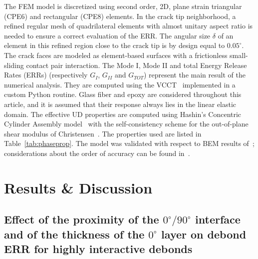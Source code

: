 \documentclass[review]{elsarticle}
\begin{document}
The FEM model is discretized using second order, 2D, plane strain triangular (CPE6) and rectangular (CPE8) elements. In the crack tip neighborhood, a refined regular mesh of quadrilateral elements with almost unitary aspect ratio is needed to ensure a correct evaluation of the ERR. The angular size $\delta$ of an element in this refined region close to the crack tip is by design equal to $0.05^{\circ}$. The crack faces are modeled as element-based surfaces with a frictionless small-sliding contact pair interaction. The Mode I, Mode II and total Energy Release Rates (ERRs) (respectively $G_{I}$, $G_{II}$ and $G_{TOT}$) represent the main result of the numerical analysis. They are computed using the VCCT~\cite{Krueger2004} implemented in a custom Python routine. Glass fiber and epoxy are considered throughout this article, and it is assumed that their response always lies in the linear elastic domain. The effective UD properties are computed using Hashin's Concentric Cylinder Assembly model~\cite{Hashin1983} with the self-consistency scheme for the out-of-plane shear modulus of Christensen~\cite{Christensen1979}. The properties used are listed in Table~\ref{tab:phaseprop}. The model was validated with respect to BEM results of~\cite{Paris2007,Sandino2016}; considerations about the order of accuracy can be found in~\cite{DiStasio2019}.


\section{Results \& Discussion}

\subsection{Effect of the proximity of the $0^{\circ}/90^{\circ}$ interface and of the thickness of the $0^{\circ}$ layer on debond ERR for highly interactive debonds}\label{subsec:thickness}
\end{document}
